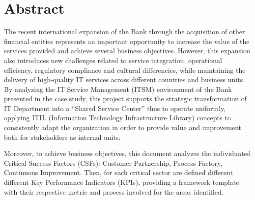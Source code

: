 \chapter{Abstract}
\label{cap:abstract}

The recent international expansion of the Bank through the acquisition of other financial entities represents an important opportunity to increase the value of the services provided and achieve several business objectives. However, this expansion also introduces new challenges related to service integration, operational efficiency, regulatory compliance and cultural differencies, while maintaining the delivery of high-quality IT services across different countries and business units. \\

By analyzing the IT Service Management (ITSM) environment of the Bank presented in the case study, this project supports the strategic transformation of IT Department into a ``Shared Service Center'' thus to operate uniformly, applying ITIL (Information Technology Infrastructure Library) concepts to consistently adapt the organization in order to provide value and improvement both for stakeholders as internal units.

Moreover, to achieve business objectives, this document analyzes the individuated Critical Success Factors (CSFs): Customer Partnership, Process Factory, Continuous Improvement. Then, for each critical sector are defined different different Key Performance Indicators (KPIs), providing a framework template with their respective metric and process involved for the areas identified.